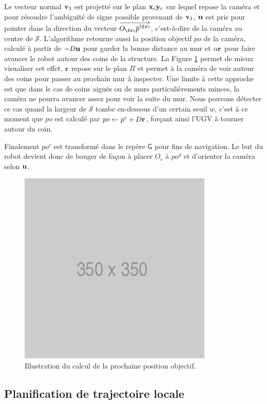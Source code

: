 Le vecteur normal $\mathbf{v}_3$ est projetté sur le plan $\mathbf{x}_c\mathbf{y}_c$ sur lequel repose la caméra et pour résoudre l'ambiguïté de signe possible provenant de $\mathbf{v}_3$, $\mathbf{u}$ est pris pour pointer dans la direction du vecteur $\overrightarrow{O_{\fr c} \overline{p}^{\fr c}}$, c'est-à-dire de la caméra au centre de $\mathcal{S}$. L'algorithme retourne aussi la position objectif ${po}$ de la caméra, calculé à partir de $-D\mathbf{u}$ pour garder la bonne distance au mur et $\alpha \mathbf{r}$ pour faire avancer le robot autour des coins de la structure. La Figure \ref{fig:ugv_goal_determination} permet de mieux visualiser cet effet, $\mathbf{r}$ repose sur le plan $\Pi$ et permet à la caméra de voir autour des coins pour passer au prochain mur à inspecter. Une limite à cette approche est que dans le cas de coins aiguës ou de murs particulièrements minces, la caméra ne pourra avancer assez pour voir la suite du mur. Nous pouvons détecter ce cas quand la largeur de $\mathcal{S}$ tombe en-dessous d'un certain seuil $w$, c'est à ce moment que ${po}$ est calculé par ${po} \gets p^c + D \mathbf{r}$, forçant ainsi l'UGV à tourner autour du coin.

Finalement ${po^c}$ est transformé dans le repère $\mathsf{G}$ pour fins de navigation. Le but du robot devient donc de bouger de façon à placer $O_c$ à ${po^g}$ et d'orienter la caméra selon $\mathbf{u}$.

\begin{figure}[htp]
  \centering
  \includegraphics[width=0.3\linewidth]{images/placeholder.png}
  \caption{Illustration du calcul de la prochaine position objectif.}
  \label{fig:ugv_goal_determination}
\end{figure}

\subsection{Planification de trajectoire locale}

